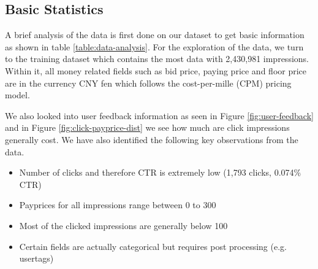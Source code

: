 \documentclass{sig-alternate-05-2015}
\begin{document}
\subsection{Basic Statistics}
A brief analysis of the data is first done on our dataset to get basic information as shown in table \ref{table:data-analysis}. For the exploration of the data, we turn to the training dataset which contains the most data with 2,430,981 impressions. Within it, all money related fields such as bid price, paying price and floor price are in the currency CNY fen which follows the cost-per-mille (CPM) pricing model.

We also looked into user feedback information as seen in Figure \ref{fig:user-feedback} and in Figure \ref{fig:click-payprice-dist} we see how much are click impressions generally cost. We have also identified the following key observations from the data.

\begin{itemize}
    \item Number of clicks and therefore CTR is extremely low (1,793 clicks, 0.074\% CTR)
    \item Payprices for all impressions range between 0 to 300
    \item Most of the clicked impressions are generally below 100
    \item Certain fields are actually categorical but requires post processing (e.g. usertags)
\end{itemize}
\end{document}
